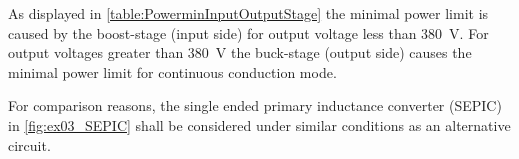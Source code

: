 \begin{solutionblock}
    As displayed in \autoref{table:PowerminInputOutputStage} the minimal power limit is caused by the 
    boost-stage (input side) for output voltage less than \SI{380}{\volt}. For output voltages greater than \SI{380}{\volt} 
    the buck-stage (output side) causes the minimal power limit for continuous conduction mode.
\end{solutionblock}

\vspace{2em}\par
For comparison reasons, the single ended primary inductance converter (SEPIC) in \autoref{fig:ex03_SEPIC} shall be considered under similar conditions as an alternative circuit.



